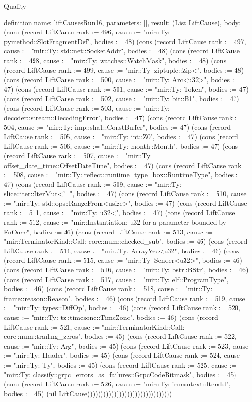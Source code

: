 \begin{lexlean}{Quality}
\begin{semanticmodule}
definition{
  name: liftCausesRun16,
  parameters: [],
  result: (List LiftCause),
  body: (cons (record LiftCause {rank := 496, cause := "mir::Ty: pymethod::SlotFragmentDef", bodies := 48}) (cons (record LiftCause {rank := 497, cause := "mir::Ty: std::net::SocketAddr", bodies := 48}) (cons (record LiftCause {rank := 498, cause := "mir::Ty: watches::WatchMask", bodies := 48}) (cons (record LiftCause {rank := 499, cause := "mir::Ty: ziptuple::Zip<", bodies := 48}) (cons (record LiftCause {rank := 500, cause := "mir::Ty: Arc<u32>", bodies := 47}) (cons (record LiftCause {rank := 501, cause := "mir::Ty: Token", bodies := 47}) (cons (record LiftCause {rank := 502, cause := "mir::Ty: bit::B1", bodies := 47}) (cons (record LiftCause {rank := 503, cause := "mir::Ty: decoder::stream::DecodingError", bodies := 47}) (cons (record LiftCause {rank := 504, cause := "mir::Ty: imp::sha1::ConstBuffer", bodies := 47}) (cons (record LiftCause {rank := 505, cause := "mir::Ty: int::Z0", bodies := 47}) (cons (record LiftCause {rank := 506, cause := "mir::Ty: month::Month", bodies := 47}) (cons (record LiftCause {rank := 507, cause := "mir::Ty: offset_date_time::OffsetDateTime", bodies := 47}) (cons (record LiftCause {rank := 508, cause := "mir::Ty: reflect::runtime_type_box::RuntimeType", bodies := 47}) (cons (record LiftCause {rank := 509, cause := "mir::Ty: slice::iter::IterMut<'_", bodies := 47}) (cons (record LiftCause {rank := 510, cause := "mir::Ty: std::ops::RangeFrom<usize>", bodies := 47}) (cons (record LiftCause {rank := 511, cause := "mir::Ty: u32<", bodies := 47}) (cons (record LiftCause {rank := 512, cause := "mir::Instantiation: u32 for a parameter bounded by FnOnce", bodies := 46}) (cons (record LiftCause {rank := 513, cause := "mir::TerminatorKind::Call: core::num::checked_sub", bodies := 46}) (cons (record LiftCause {rank := 514, cause := "mir::Ty: ArrayVec<u32", bodies := 46}) (cons (record LiftCause {rank := 515, cause := "mir::Ty: Sender<u32>", bodies := 46}) (cons (record LiftCause {rank := 516, cause := "mir::Ty: bstr::BStr", bodies := 46}) (cons (record LiftCause {rank := 517, cause := "mir::Ty: elf::ProgramType", bodies := 46}) (cons (record LiftCause {rank := 518, cause := "mir::Ty: frame::reason::Reason", bodies := 46}) (cons (record LiftCause {rank := 519, cause := "mir::Ty: types::DiffOp", bodies := 46}) (cons (record LiftCause {rank := 520, cause := "mir::Ty: tz::timezone::TimeZone", bodies := 46}) (cons (record LiftCause {rank := 521, cause := "mir::TerminatorKind::Call: core::num::trailing_zeros", bodies := 45}) (cons (record LiftCause {rank := 522, cause := "mir::Ty: Arg", bodies := 45}) (cons (record LiftCause {rank := 523, cause := "mir::Ty: Header", bodies := 45}) (cons (record LiftCause {rank := 524, cause := "mir::Ty: Ty", bodies := 45}) (cons (record LiftCause {rank := 525, cause := "mir::Ty: classify::grpc_errors_as_failures::GrpcCodeBitmask", bodies := 45}) (cons (record LiftCause {rank := 526, cause := "mir::Ty: ir::context::ItemId", bodies := 45}) (nil LiftCause))))))))))))))))))))))))))))))))
}


\end{semanticmodule}
\end{lexlean}
